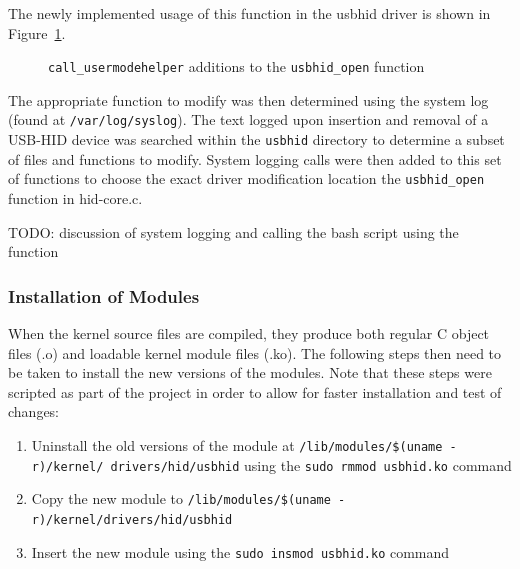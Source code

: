 \documentclass[pagenumbers]{ieee}
\begin{document}
The newly implemented usage of this function in the usbhid driver is shown in Figure~\ref{fig:usermodehelper_code}.

\begin{figure}[H]
   \caption{\texttt{call\_usermodehelper} additions to the \texttt{usbhid\_open} function}
   \label{fig:usermodehelper_code}
\end{figure}

The appropriate function to modify was then determined using the system log (found at \texttt{/var/log/syslog}). The text logged upon insertion and removal of a USB-HID device was searched within the \texttt{usbhid} directory to determine a subset of files and functions to modify. System logging calls were then added to this set of functions to choose the exact driver modification location \textemdash the \texttt{usbhid\_open} function in hid-core.c.

TODO: discussion of system logging and calling the bash script using the function

\subsubsection{Installation of Modules}

When the kernel source files are compiled, they produce both regular C object files (.o) and loadable kernel module files (.ko). The following steps then need to be taken to install the new versions of the modules. Note that these steps were scripted as part of the project in order to allow for faster installation and test of changes:

\begin{enumerate}
\item Uninstall the old versions of the module at \texttt{/lib/modules/\$(uname -r)/kernel/ drivers/hid/usbhid} using the \texttt{sudo rmmod usbhid.ko} command
\item Copy the new module to \texttt{/lib/modules/\$(uname -r)/kernel/drivers/hid/usbhid}
\item Insert the new module using the \texttt{sudo insmod usbhid.ko} command
\end{enumerate} 
\end{document}
